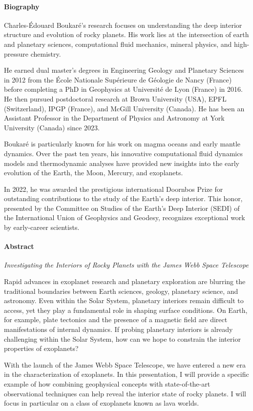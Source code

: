 \paragraph{Biography}
{\sffamily
Charles-Édouard Boukaré's research focuses on understanding the deep interior structure and evolution of rocky planets. His work lies at the intersection of earth and planetary sciences, computational fluid mechanics, mineral physics, and high-pressure chemistry.

He earned dual master's degrees in Engineering Geology and Planetary Sciences in 2012 from the École Nationale Supérieure de Géologie de Nancy (France) before completing a PhD in Geophysics at Université de Lyon (France) in 2016. He then pursued postdoctoral research at Brown University (USA), EPFL (Switzerland), IPGP (France), and McGill University (Canada). He has been an Assistant Professor in the Department of Physics and Astronomy at York University (Canada) since 2023.

Boukaré is particularly known for his work on magma oceans and early mantle dynamics. Over the past ten years, his innovative computational fluid dynamics models and thermodynamic analyses have provided new insights into the early evolution of the Earth, the Moon, Mercury, and exoplanets.

In 2022, he was awarded the prestigious international Doornbos Prize for outstanding contributions to the study of the Earth's deep interior. This honor, presented by the Committee on Studies of the Earth's Deep Interior (SEDI) of the International Union of Geophysics and Geodesy, recognizes exceptional work by early-career scientists.
}

\paragraph{Abstract}
{\itshape
Investigating the Interiors of Rocky Planets with the James Webb Space Telescope

Rapid advances in exoplanet research and planetary exploration are blurring the traditional boundaries between Earth sciences, geology, planetary science, and astronomy. Even within the Solar System, planetary interiors remain difficult to access, yet they play a fundamental role in shaping surface conditions. On Earth, for example, plate tectonics and the presence of a magnetic field are direct manifestations of internal dynamics. If probing planetary interiors is already challenging within the Solar System, how can we hope to constrain the interior properties of exoplanets?

With the launch of the James Webb Space Telescope, we have entered a new era in the characterization of exoplanets. In this presentation, I will provide a specific example of how combining geophysical concepts with state-of-the-art observational techniques can help reveal the interior state of rocky planets. I will focus in particular on a class of exoplanets known as lava worlds.
}

